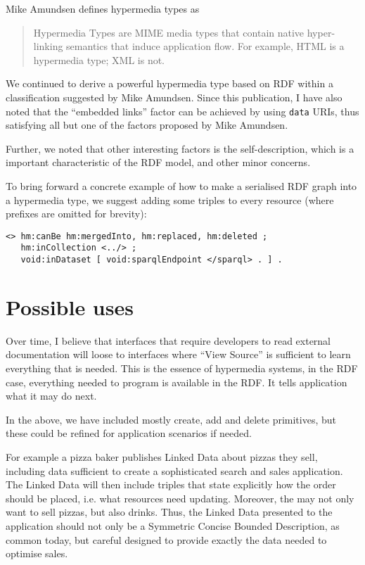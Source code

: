 \documentclass{article}
\begin{document}
Mike Amundsen defines hypermedia types\cite{hypermediatypes} as 
\begin{quote}
Hypermedia Types are MIME media types that contain native
hyper-linking semantics that induce application flow. For example,
HTML is a hypermedia type; XML is not.
\end{quote}

We continued to derive a powerful hypermedia type based on RDF within
a classification suggested by Mike Amundsen. Since this publication, I
have also noted that the ``embedded links'' factor can be achieved by
using \texttt{data} URIs, thus satisfying all but one of the factors
proposed by Mike Amundsen.

Further, we noted that other interesting factors is the
self-description, which is a important characteristic of the RDF
model, and other minor concerns.

To bring forward a concrete example of how to make a serialised RDF
graph into a hypermedia type, we suggest adding some triples to every
resource (where prefixes are omitted for brevity):

\begin{verbatim}
<> hm:canBe hm:mergedInto, hm:replaced, hm:deleted ;
   hm:inCollection <../> ;
   void:inDataset [ void:sparqlEndpoint </sparql> . ] .
\end{verbatim}

\section{Possible uses}

Over time, I believe that interfaces that require developers to read
external documentation will loose to interfaces where ``View Source''
is sufficient to learn everything that is needed. This is the essence
of hypermedia systems, in the RDF case, everything needed to program
is available in the RDF. It tells application what it may do next.

In the above, we have included mostly create, add and delete
primitives, but these could be refined for application scenarios if
needed.

For example a pizza baker publishes Linked Data about pizzas they
sell, including data sufficient to create a sophisticated search and
sales application. The Linked Data will then include triples that
state explicitly how the order should be placed, i.e. what resources
need updating. Moreover, the may not only want to sell pizzas, but
also drinks. Thus, the Linked Data presented to the application should
not only be a Symmetric Concise Bounded Description, as common today,
but careful designed to provide exactly the data needed to optimise
sales.
\end{document}
